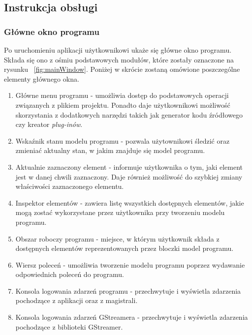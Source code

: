 \documentclass[12pt]{article}
\begin{document}
\subsection{Instrukcja obsługi}
\subsubsection{Główne okno programu}
Po uruchomieniu aplikacji użytkownikowi ukaże się główne okno programu. Składa się ono z ośmiu podstawowych modułów, które zostały oznaczone na rysunku ~\ref{fig:mainWindow}. Poniżej w skrócie zostaną omówione poszczególne elementy głównego okna.
\begin{enumerate}
  \setlength{\itemsep}{0em}
\item Główne menu programu - umożliwia dostęp do podstawowych operacji związanych z plikiem projektu. Ponadto daje użytkownikowi możliwość skorzystania z dodatkowych narzędzi takich jak generator kodu źródłowego czy kreator \textit{plug-inów}.
\item Wskaźnik stanu modelu programu - pozwala użytownikowi śledzić oraz zmieniać aktualny stan, w jakim znajduje się model programu.
\item Aktualnie zaznaczony element - informuje użytkownika o tym, jaki element jest w danej chwili zaznaczony. Daje również możliwość do szybkiej zmiany właściwości zaznaczonego elementu.
\item Inspektor elementów - zawiera listę wszystkich dostępnych elementów, jakie mogą zostać wykorzystane przez użytkownika przy tworzeniu modelu programu.
\item Obszar roboczy programu - miejsce, w którym użytkownik składa z dostępnych elementów reprezentowanych przez bloczki model programu.
\item Wiersz poleceń - umożliwia tworzenie modelu programu poprzez wydawanie odpowiednich poleceń do programu.
\item Konsola logowania zdarzeń programu - przechwytuje i wyświetla zdarzenia pochodzące z aplikacji oraz z magistrali.
\item Konsola logowania zdarzeń GStreamera - przechwytuje i wyświetla zdarzenia pochodzące z biblioteki GStreamer.
\end{enumerate}
\end{document}
